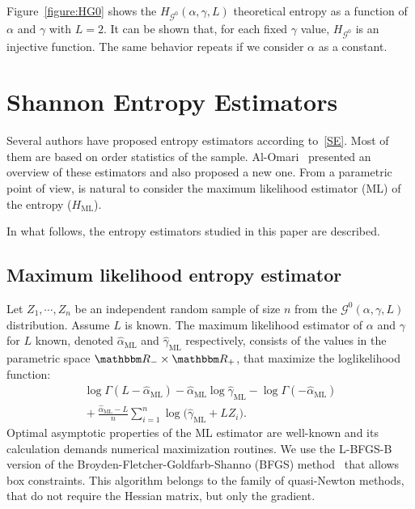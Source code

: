 \documentclass[journal]{IEEEtran}
\begin{document}
	Figure~\ref{figure:HG0} shows the $H_{\mathcal G^0}(\alpha,\gamma,L)$ theoretical entropy as a function of $\alpha$ and $\gamma$ with $L=2$. 
	It can be shown that, for each fixed $\gamma$ value, $H_{\mathcal G^0}$ is an injective function. The same behavior repeats if we consider $\alpha$ as a constant.
	
	\section{Shannon Entropy Estimators}
	
	Several authors have proposed entropy estimators according to~\eqref{SE}.
	Most of them are based on order statistics of the sample. 
	Al-Omari~\cite{AlOmari2016} presented an overview of these estimators and also proposed a new one. 
	From a parametric point of view, is natural to consider the maximum likelihood estimator (ML) of the entropy ($H_{\text{ML}}$).
	
	In what follows, the entropy estimators studied in this paper are described.
	
	\subsection{Maximum likelihood entropy estimator}
	
	Let $Z_1,\cdots, Z_n$ be an independent random sample of size $n$ from the $\mathcal G^0(\alpha,\gamma,L)$ distribution.
	Assume $L$ is known.
	The maximum likelihood estimator of $\alpha$ and $\gamma$ for $L$ known, denoted $\widehat\alpha_{\text{ML}}$ and $\widehat\gamma_{\text{ML}}$ respectively, consists of the values in the parametric space $\mathbbm R_-\times\mathbbm R_+$, that maximize the loglikelihood function:
	\begin{align}
		\log \Gamma(L-\widehat\alpha_{\text{ML}})-
		\widehat\alpha_{\text{ML}}\log \widehat\gamma_{\text{ML}} -\log\Gamma(-\widehat\alpha_{\text{ML}}) \nonumber \\
		\mbox{}+\frac{\widehat\alpha_{\text{ML}}-L}{n} \sum_{i=1}^n\log\big(\widehat\gamma_{\text{ML}}+L Z_i\big).
		\label{ML}
	\end{align}
	Optimal asymptotic properties of the ML estimator are well-known and its calculation demands numerical maximization routines.
	We use the L-BFGS-B version of the Broyden-Fletcher-Goldfarb-Shanno (BFGS) method~\cite{Luenberger2008} that allows box constraints.
	This algorithm belongs to the family of quasi-Newton methods, that do not require the Hessian matrix, but only the gradient.
	
\end{document}
